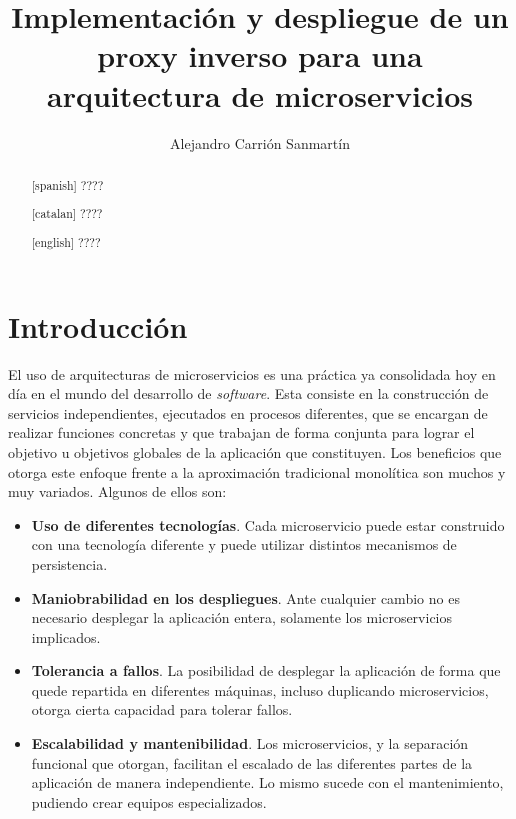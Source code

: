 \documentclass[11pt,spanish,listoffigures]{tfgetsinf}
\title{Implementación y despliegue de un proxy inverso para una arquitectura de microservicios}
\author{Alejandro Carrión Sanmartín}
\begin{document}

\begin{abstract}[spanish]
????
\end{abstract}
\begin{abstract}[catalan]
????
\end{abstract}
\begin{abstract}[english]
????
\end{abstract}

\mainmatter


\chapter{Introducción}

El uso de arquitecturas de microservicios es una práctica ya consolidada hoy en día en el mundo del desarrollo de \emph{software}. Esta consiste en la construcción de servicios independientes, ejecutados en procesos diferentes, que se encargan de realizar funciones concretas y que trabajan de forma conjunta para lograr el objetivo u objetivos globales de la aplicación que constituyen. Los beneficios que otorga este enfoque frente a la aproximación tradicional monolítica son muchos y muy variados. Algunos de ellos son:

\begin{itemize}

\item \textbf{Uso de diferentes tecnologías}.
Cada microservicio puede estar construido con una tecnología diferente y puede utilizar distintos mecanismos de persistencia.

\item \textbf{Maniobrabilidad en los despliegues}.
Ante cualquier cambio no es necesario desplegar la aplicación entera, solamente los microservicios implicados.

\item \textbf{Tolerancia a fallos}.
La posibilidad de desplegar la aplicación de forma que quede repartida en diferentes máquinas, incluso duplicando microservicios, otorga cierta capacidad para tolerar fallos.

\item \textbf{Escalabilidad y mantenibilidad}.
Los microservicios, y la separación funcional que otorgan, facilitan el escalado de las diferentes partes de la aplicación de manera independiente. Lo mismo sucede con el mantenimiento, pudiendo crear equipos especializados.

\end{itemize}
\end{document}
